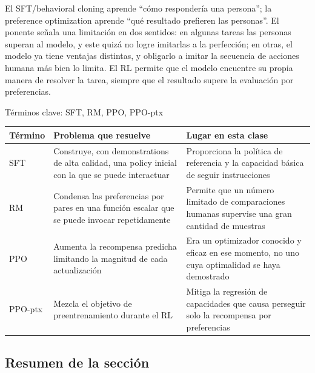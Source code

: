 \documentclass[a4paper]{article}
\begin{document}
El SFT/behavioral cloning aprende ``cómo respondería una persona''; la preference optimization aprende ``qué resultado prefieren las personas''. El ponente señala una limitación en dos sentidos: en algunas tareas las personas superan al modelo, y este quizá no logre imitarlas a la perfección; en otras, el modelo ya tiene ventajas distintas, y obligarlo a imitar la secuencia de acciones humana más bien lo limita. El RL permite que el modelo encuentre su propia manera de resolver la tarea, siempre que el resultado supere la evaluación por preferencias.

\begin{knowledgebox}{Términos clave: SFT, RM, PPO, PPO-ptx}
\begin{tabularx}{\textwidth}{L{2.2cm} >{\raggedright\arraybackslash}X >{\raggedright\arraybackslash}X}
\toprule
Término & Problema que resuelve & Lugar en esta clase \\
\midrule
SFT & Construye, con demonstrations de alta calidad, una policy inicial con la que se puede interactuar & Proporciona la política de referencia y la capacidad básica de seguir instrucciones \\
RM & Condensa las preferencias por pares en una función escalar que se puede invocar repetidamente & Permite que un número limitado de comparaciones humanas supervise una gran cantidad de muestras \\
PPO & Aumenta la recompensa predicha limitando la magnitud de cada actualización & Era un optimizador conocido y eficaz en ese momento, no uno cuya optimalidad se haya demostrado \\
PPO-ptx & Mezcla el objetivo de preentrenamiento durante el RL & Mitiga la regresión de capacidades que causa perseguir solo la recompensa por preferencias \\
\bottomrule
\end{tabularx}
\end{knowledgebox}


\subsection{Resumen de la sección}
\end{document}
